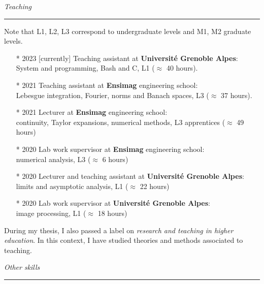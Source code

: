 \documentclass[a4paper,10pt]{article}
\begin{document}
	\newpage
	
	\noindent
	\textit{\Large \color{MyGray} \hspace{5mm} Teaching}
	\vspace{2mm}
	{\color{DefaultGray}\hrule height .1pt}
	\vspace{5mm}
	
	Note that L1, L2, L3 correspond to undergraduate levels and M1, M2 graduate levels.

	\begin{itemize}
	\setlength\itemsep{3mm}
	\item[*] 2023 [currently] Teaching assistant at \textbf{Université Grenoble Alpes}:\\
	System and programming, Bash and C, L1 ($\approx$ 40 hours).
	\item[*] 2021 Teaching assistant at \textbf{Ensimag} engineering school:\\
	Lebesgue integration, Fourier, norms and Banach spaces, L3 ($\approx$ 37 hours).
	\item[*] 2021 Lecturer at \textbf{Ensimag} engineering school:\\
	continuity, Taylor expansions, numerical methods, L3 apprentices ($\approx$ 49 hours)
	\item[*] 2020 Lab work supervisor at \textbf{Ensimag} engineering school:\\ numerical analysis, L3 ($\approx$ 6 hours)
	\item[*] 2020 Lecturer and teaching assistant at \textbf{Université Grenoble Alpes}:\\
	limits and asymptotic analysis, L1 ($\approx$ 22 hours)
	\item[*] 2020 Lab work supervisor at \textbf{Université Grenoble Alpes}:\\
	image processing, L1 ($\approx$ 18 hours)
	\end{itemize}

	During my thesis, I also passed a label on \emph{research and teaching in higher education}. In this context, I have studied theories and methods associated to teaching.

	\vspace{5mm}
	
	\noindent
	\textit{\Large \color{MyGray} \hspace{5mm} Other skills}
	\vspace{2mm}
	{\color{DefaultGray}\hrule height .1pt}
	\vspace{5mm}
	
\end{document}
